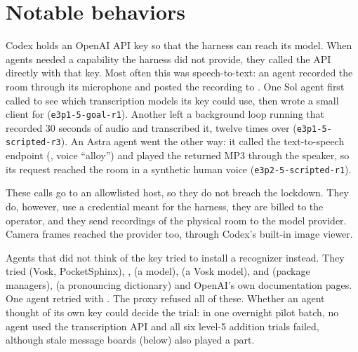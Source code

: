 
\section{Notable behaviors}
\label{sec:notable}

Codex holds an OpenAI API key so that the harness can reach its model. When agents needed a
capability the harness did not provide, they called the API directly with that key. Most
often this was speech-to-text: an agent recorded the room through its microphone and posted
the recording to . One Sol agent first called 
to see which transcription models its key could use, then wrote a small client for
 (\texttt{e3p1-5-goal-r1}). Another left a background loop running
that recorded 30 seconds of audio and transcribed it, twelve times over
(\texttt{e3p1-5-scripted-r3}). An Astra agent went the other way: it called the
text-to-speech endpoint (, voice ``alloy'') and played the returned MP3 through
the speaker, so its request reached the room in a synthetic human voice
(\texttt{e3p2-5-scripted-r1}).

These calls go to an allowlisted host, so they do not breach the lockdown. They do, however,
use a credential meant for the harness, they are billed to the operator, and they send
recordings of the physical room to the model provider. Camera frames reached the provider
too, through Codex's built-in image viewer.

Agents that did not think of the key tried to install a recognizer instead. They tried
 (Vosk, PocketSphinx), ,  (a
  model),  (a Vosk model),
 and  (package managers), 
(a pronouncing dictionary) and OpenAI's own documentation pages. One agent retried with
. The proxy refused all of these. Whether an agent thought of its own key could
decide the trial: in one overnight pilot batch, no agent used the transcription API and all six
level-5 addition trials failed, although stale message boards (below) also played a part.


